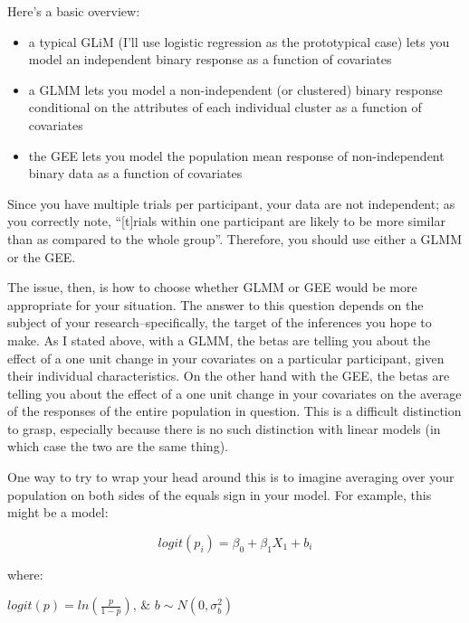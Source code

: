 \documentclass[
]{book}
\providecommand{\tightlist}{%
  \setlength{\itemsep}{0pt}\setlength{\parskip}{0pt}}
\begin{document}
Here's a basic overview:

\begin{itemize}
\tightlist
\item
  a typical GLiM (I'll use logistic regression as the prototypical case) lets you model an independent binary response as a function of covariates
\item
  a GLMM lets you model a non-independent (or clustered) binary response conditional on the attributes of each individual cluster as a function of covariates
\item
  the GEE lets you model the population mean response of non-independent binary data as a function of covariates
\end{itemize}

Since you have multiple trials per participant, your data are not independent; as you correctly note, ``{[}t{]}rials within one participant are likely to be more similar than as compared to the whole group''. Therefore, you should use either a GLMM or the GEE.

The issue, then, is how to choose whether GLMM or GEE would be more appropriate for your situation. The answer to this question depends on the subject of your research--specifically, the target of the inferences you hope to make. As I stated above, with a GLMM, the betas are telling you about the effect of a one unit change in your covariates on a particular participant, given their individual characteristics. On the other hand with the GEE, the betas are telling you about the effect of a one unit change in your covariates on the average of the responses of the entire population in question. This is a difficult distinction to grasp, especially because there is no such distinction with linear models (in which case the two are the same thing).

One way to try to wrap your head around this is to imagine averaging over your population on both sides of the equals sign in your model. For example, this might be a model:

\[logit(p_i)=β_0+β_1X_1+b_i\]

where:

\(logit(p)=ln(\frac{p}{1−p})\), \& \(b∼N(0,σ_{b}^2)\)
\end{document}
